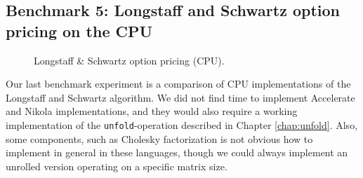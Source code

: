 \subsection{Benchmark 5: Longstaff and Schwartz option pricing on the CPU}
\begin{figure}
	\centering
\begin{adjustbox}{minipage=1.3\textwidth,margin=0pt \smallskipamount,center}
\end{adjustbox}
  \caption{Longstaff \& Schwartz option pricing (CPU).}
\label{fig:lsm-cpu}
\end{figure}

Our last benchmark experiment is a comparison of CPU implementations
of the Longstaff and Schwartz algorithm. We did not find time to
implement Accelerate and Nikola implementations, and they would also
require a working implementation of the \lstinline{unfold}-operation
described in Chapter \ref{chap:unfold}. Also, some components, such as
Cholesky factorization is not obvious how to implement in general in
these languages, though we could always implement an unrolled version
operating on a specific matrix size.

